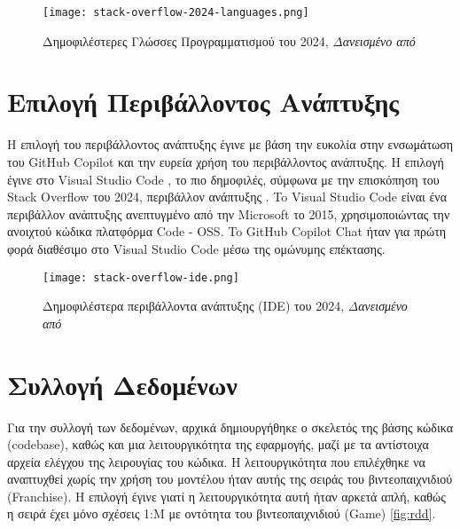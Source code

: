 \begin{figure}[H]
  \begin{center}
    \texttt{[image: stack-overflow-2024-languages.png]}
    \caption{Δημοφιλέστερες Γλώσσες Προγραμματισμού του 2024,
    \textit{Δανεισμένο από \cite{so2024}}}
  \end{center}
  \label{fig:SO2024LANGS}
\end{figure}

\section{Επιλογή Περιβάλλοντος Ανάπτυξης }

Η επιλογή του περιβάλλοντος ανάπτυξης έγινε με βάση την ευκολία στην
ενσωμάτωση του \textlatin{GitHub Copilot} και την ευρεία χρήση του
περιβάλλοντος ανάπτυξης. Η επιλογή έγινε στο \textlatin{Visual Studio
Code} \cite{vscode}, το πιο δημοφιλές, σύμφωνα με την επισκόπηση του
\textlatin{Stack Overflow} του 2024, περιβάλλον ανάπτυξης
\cite{so2024}. To \textlatin{Visual Studio Code} είναι ένα περιβάλλον
ανάπτυξης ανεπτυγμένο από την \textlatin{Microsoft} το 2015,
χρησιμοποιώντας την ανοιχτού κώδικα πλατφόρμα \textlatin{Code - OSS}. To
\textlatin{GitHub Copilot Chat} ήταν για πρώτη φορά διαθέσιμο στο
\textlatin{Visual Studio Code} μέσω της ομώνυμης επέκτασης.
\cite{copilotchatrepo}

\begin{figure}[H]
  \begin{center}
    \texttt{[image: stack-overflow-ide.png]}
    \caption{Δημοφιλέστερα περιβάλλοντα ανάπτυξης (\textlatin{IDE}) του
    2024, \textit{Δανεισμένο από \cite{so2024}}}
  \end{center}
  \label{fig:SO2024IDES}
\end{figure}

\section{Συλλογή Δεδομένων}

Για την συλλογή των δεδομένων, αρχικά δημιουργήθηκε ο σκελετός της βάσης
κώδικα \textlatin{(codebase)}, καθώς και μια λειτουργικότητα της
εφαρμογής, μαζί με τα αντίστοιχα αρχεία ελέγχου της λειρουγίας του
κώδικα. Η λειτουργικότητα που επιλέχθηκε να αναπτυχθεί χωρίς την χρήση
του μοντέλου ήταν αυτής της σειράς του βιντεοπαιχνιδιού
\textlatin{(Franchise)}. Η επιλογή έγινε γιατί η λειτουργικότητα αυτή
ήταν αρκετά απλή, καθώς η σειρά έχει μόνο σχέσεις 1:Μ με οντότητα του
βιντεοπαιχνιδιού \textlatin{(Game)} \ref{fig:rdd}.

